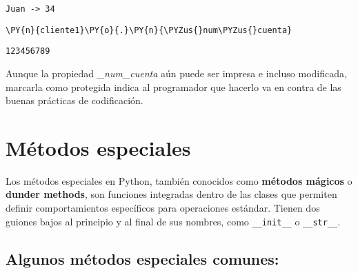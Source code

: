     \begin{Verbatim}[commandchars=\\\{\}]
Juan -> 34
    \end{Verbatim}

    \begin{tcolorbox}[breakable, size=fbox, boxrule=1pt, pad at break*=1mm,colback=cellbackground, colframe=cellborder]
\begin{Verbatim}[commandchars=\\\{\}]
\PY{n}{cliente1}\PY{o}{.}\PY{n}{\PYZus{}num\PYZus{}cuenta}
\end{Verbatim}
\end{tcolorbox}

            \begin{tcolorbox}[breakable, size=fbox, boxrule=.5pt, pad at break*=1mm, opacityfill=0]
\begin{Verbatim}[commandchars=\\\{\}]
123456789
\end{Verbatim}
\end{tcolorbox}
        
Aunque la propiedad \emph{\_num\_cuenta} aún puede ser impresa e incluso
modificada, marcarla como protegida indica al programador que hacerlo va
en contra de las buenas prácticas de codificación.

\section{Métodos especiales}

Los métodos especiales en Python, también conocidos como \textbf{métodos
mágicos} o \textbf{dunder methods}, son funciones integradas dentro de
las clases que permiten definir comportamientos específicos para
operaciones estándar. Tienen dos guiones bajos al principio y al final
de sus nombres, como \texttt{\_\_init\_\_} o \texttt{\_\_str\_\_}.

\subsection{Algunos métodos especiales comunes:}

